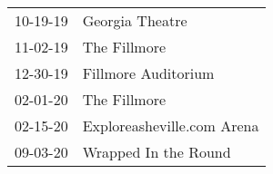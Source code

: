 \begin{supertabular}{ll}
                  10-19-19\textsuperscript{} &                                  Georgia Theatre \\
                  11-02-19\textsuperscript{} &                                     The Fillmore \\
                  12-30-19\textsuperscript{} &                              Fillmore Auditorium \\
                  02-01-20\textsuperscript{} &                                     The Fillmore \\
                  02-15-20\textsuperscript{} &                       Exploreasheville.com Arena \\
                  09-03-20\textsuperscript{} &                             Wrapped In the Round \\
\end{supertabular}
